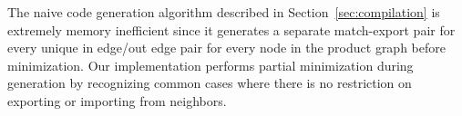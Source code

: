 
The naive code generation algorithm described in Section~\ref{sec:compilation} is extremely memory inefficient since it generates a separate match-export pair for every unique in edge/out edge pair for every node in the product graph before minimization. Our implementation performs partial minimization during generation by recognizing common cases where there is no restriction on exporting or importing from neighbors.

